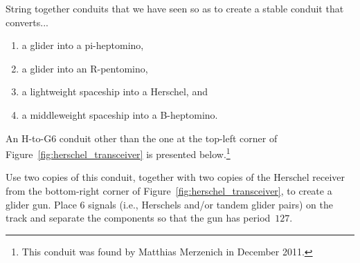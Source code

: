 \begin{multicols}{2}
	
	\mfilbreak
	
	
	\begin{problem}\label{exer:composite_converters}
		String together conduits that we have seen so as to create a stable conduit that converts...\smallskip
		
		\begin{enumerate}[label=\bf\color{ocre}(\alph*)]
			\item a glider into a pi-heptomino,
			
			\item a glider into an R-pentomino,
			
			\item a lightweight spaceship into a Herschel, and
			
			\item a middleweight spaceship into a B-heptomino.
		\end{enumerate}
	\end{problem}
	
	
	\mfilbreak
	
	
	\begin{problem}\label{exer:h_to_g6}
		An H-to-G6 conduit other than the one at the top-left corner of Figure~\ref{fig:herschel_transceiver} is presented below.\footnote{This conduit was found by Matthias Merzenich in December 2011.}
		
		\begin{center}
		\end{center}
		
		\noindent Use two copies of this conduit, together with two copies of the Herschel receiver from the bottom-right corner of Figure~\ref{fig:herschel_transceiver}, to create a glider gun. Place $6$ signals (i.e., Herschels and/or tandem glider pairs) on the track and separate the components so that the gun has period~$127$.
	\end{problem}
	

\end{multicols}
